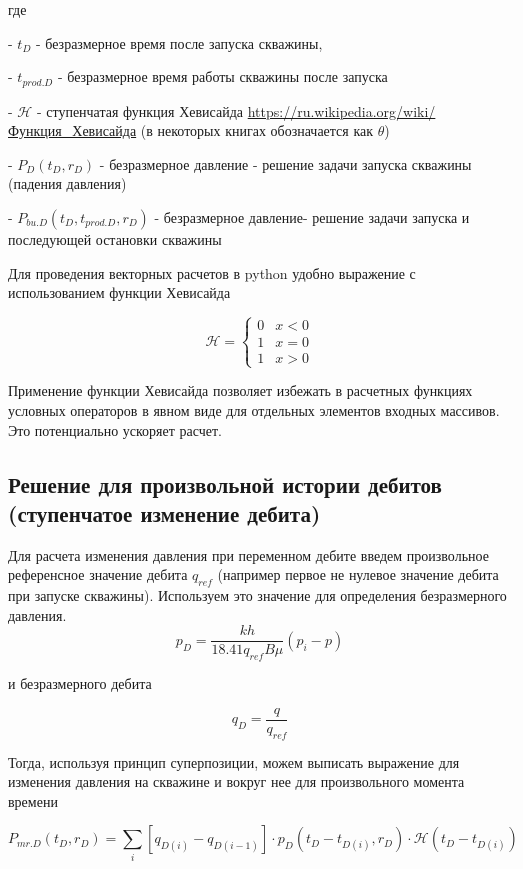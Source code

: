 \documentclass[oneside, openany]{memoir}
\begin{document}
	где
	
	- $t_D$ - безразмерное время после запуска скважины,
	
	- $t_{prod.D}$ - безразмерное время работы скважины после запуска
	
	- $\mathcal{H}$ - ступенчатая функция Хевисайда \url{https://ru.wikipedia.org/wiki/Функция_Хевисайда} (в некоторых книгах обозначается как $\theta$)
	
	- $P_D(t_D, r_D)$ - безразмерное давление - решение задачи запуска скважины (падения давления)
	
	- $P_{bu.D}(t_D, t_{prod.D}, r_D)$ - безразмерное давление- решение задачи запуска  и последующей остановки скважины
	
	Для проведения векторных расчетов в python удобно выражение с использованием функции Хевисайда
	
	$$ \mathcal{H} = \begin{cases}0 & x < 0\\1 & x = 0\\1 & x > 0\end{cases}$$
	
	Применение функции Хевисайда позволяет избежать в расчетных функциях условных операторов в явном виде для отдельных элементов входных массивов. Это потенциально ускоряет расчет. 
	
	
	\subsection{Решение для произвольной истории дебитов (ступенчатое изменение дебита)} 
	
	Для расчета изменения давления при переменном дебите введем произвольное референсное значение дебита $ q_{ref} $ (например первое не нулевое значение дебита при запуске скважины). Используем это значение для определения безразмерного давления.
	$$ p_D = \frac{kh}{ 18.41 q_{ref} B \mu} \left( p_i - p \right) $$
	
	и безразмерного дебита 
	
	$$q_D = \frac{q}{q_{ref}} $$
	
	Тогда, используя принцип суперпозиции, можем выписать выражение для изменения давления на скважине и вокруг нее для произвольного момента времени
	
	\begin{equation}
	P_{mr.D}(t_D, r_D) = \sum_i \left[ q_{D(i)}-q_{D(i-1)} \right] \cdot p_D\left(t_D-t_{D(i)}, r_D\right)\cdot \mathcal{H}(t_D-t_{D(i)}) \tag{7} 
	\end{equation}
	
\end{document}
